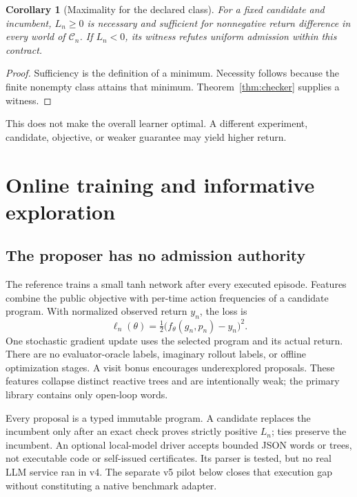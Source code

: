 \documentclass[10pt,twocolumn]{article}
\newtheorem{corollary}[theorem]{Corollary}
\newcommand{\C}{\mathcal C}
\begin{document}
\begin{corollary}[Maximality for the declared class]\label{cor:maximal}
For a fixed candidate and incumbent, $L_n\geq0$ is necessary and sufficient for
nonnegative return difference in every world of $\C_n$. If $L_n<0$, its witness
refutes uniform admission within this contract.
\end{corollary}
\begin{proof}
Sufficiency is the definition of a minimum. Necessity follows because the finite
nonempty class attains that minimum. Theorem~\ref{thm:checker} supplies a witness.
\end{proof}
This does not make the overall learner optimal. A different experiment,
candidate, objective, or weaker guarantee may yield higher return.

\section{Online training and informative exploration}
\subsection{The proposer has no admission authority}
The reference trains a small tanh network after every executed episode.
Features combine the public objective with per-time action frequencies of a
candidate program. With normalized observed return $y_n$, the loss is
\begin{equation}
 \ell_n(\theta)=\tfrac12\big(f_\theta(g_n,p_n)-y_n\big)^2.
\end{equation}
One stochastic gradient update uses the selected program and its actual return.
There are no evaluator-oracle labels, imaginary rollout labels, or offline
optimization stages. A visit bonus encourages underexplored proposals.
These features collapse distinct reactive trees and are intentionally weak;
the primary library contains only open-loop words.

Every proposal is a typed immutable program. A candidate replaces the incumbent
only after an exact check proves strictly positive $L_n$; ties preserve the
incumbent. An optional local-model driver accepts bounded JSON words or trees,
not executable code or self-issued certificates. Its parser is tested, but no
real LLM service ran in v4. The separate v5 pilot below closes that execution
gap without constituting a native benchmark adapter.
\end{document}
